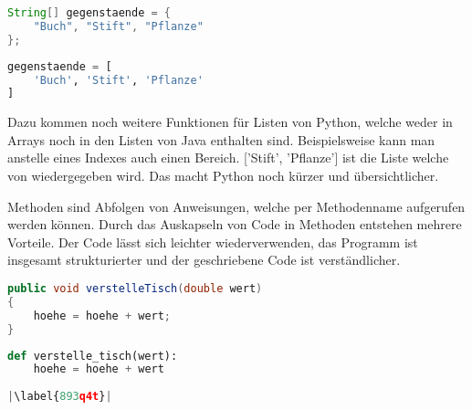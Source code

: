 \begin{minipage}{.5\linewidth}
\begin{lstlisting}[language=java,caption={Einfache Deklarierung Java},captionpos=b,label={lst:java:ezarray},frame=none]
String[] gegenstaende = {
    "Buch", "Stift", "Pflanze"
};
\end{lstlisting}
\end{minipage}
\begin{minipage}{.5\linewidth}
\begin{lstlisting}[language=python,caption={Einfach Deklarierung Python},captionpos=b,label={lst:python:ezarray},frame=l]
gegenstaende = [
    'Buch', 'Stift', 'Pflanze'
]
\end{lstlisting}
\end{minipage}

Dazu kommen noch weitere Funktionen für Listen von Python, welche weder in Arrays noch in den Listen von Java enthalten sind. Beispielsweise kann man anstelle eines Indexes auch einen Bereich. ['Stift', 'Pflanze'] ist die Liste welche von  wiedergegeben wird. Das macht Python noch kürzer und übersichtlicher.\par
Methoden sind Abfolgen von Anweisungen, welche per Methodenname aufgerufen werden können. Durch das Auskapseln von Code in Methoden entstehen mehrere Vorteile. Der Code lässt sich leichter wiederverwenden, das Programm ist insgesamt strukturierter und der geschriebene Code ist verständlicher. \cite{Python3:Buch}\cite{Louis:2010}

\begin{minipage}{.5\linewidth}
\begin{lstlisting}[language=java,caption={Methoden in Java},captionpos=b,label={lst:java:methode},frame=none]
public void verstelleTisch(double wert)
{
    hoehe = hoehe + wert;
}
\end{lstlisting}
\end{minipage}
\begin{minipage}{.5\linewidth}
\begin{lstlisting}[language=python,caption={Methode in Python},captionpos=b,label={lst:python:methode},frame=l,escapechar=|]
def verstelle_tisch(wert):
    hoehe = hoehe + wert
    
|\label{893q4t}|
\end{lstlisting}
\end{minipage}

